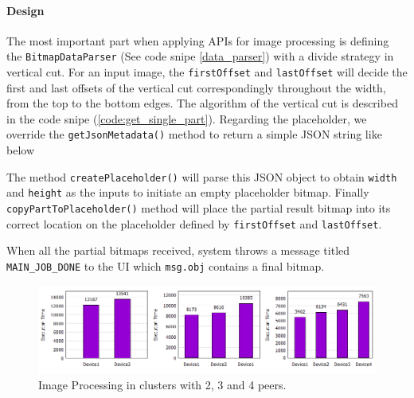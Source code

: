 \documentclass[conference]{IEEEtran}
\begin{document}
\paragraph{Design}
The most important part when applying APIs for image processing is defining the \texttt{BitmapDataParser} (See code snipe \ref{data_parser}) with a divide strategy in vertical cut. For an input image, the \texttt{firstOffset} and \texttt{lastOffset} will decide the first and last offsets of the vertical cut correspondingly throughout the width, from the top to the bottom edges. The algorithm of the vertical cut is described in the code snipe (\ref{code:get_single_part}). Regarding the placeholder, we override the \texttt{getJsonMetadata()} method to return a simple JSON string like below\\

\noindent {}

The method \texttt{createPlaceholder()} will parse this JSON object to obtain \texttt{width} and \texttt{height} as the inputs to initiate an empty placeholder bitmap. Finally \texttt{copyPartToPlaceholder()} method will place the partial result bitmap into its correct location on the placeholder defined by \texttt{firstOffset} and \texttt{lastOffset}.\\

\noindent {}

When all the partial bitmaps received, system throws a message titled \texttt{MAIN\_JOB\_DONE} to the UI which \texttt{msg.obj} contains a final bitmap.

\begin{figure}[!hbt]
  \includegraphics[width=1\textwidth, natwidth=918, natheight=239]{data/c_all}
  \caption{Image Processing in clusters with 2, 3 and 4 peers.}
	\label{fig:cluster_234}
\end{figure}
\end{document}
